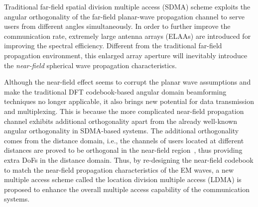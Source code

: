 \documentclass[journal,twocolumn]{IEEEtran}
\begin{document}
Traditional far-field spatial division multiple access (SDMA) scheme exploits the angular orthogonality of the far-field planar-wave propagation channel to serve users from different angles simultaneously. In order to further improve the communication rate, extremely large antenna arrays (ELAAs) are introduced for improving the spectral efficiency. Different from the traditional far-field propagation environment, this enlarged array aperture will inevitably introduce the {\it near-field} spherical wave propagation characteristics.  

Although the near-field effect seems to corrupt the planar wave assumptions and make the traditional DFT codebook-based angular domain beamforming techniques no longer applicable, it also brings new potential for data transmission and multiplexing. This is because the more complicated near-field propagation channel exhibits additional orthogonality apart from the already well-known angular orthogonality in SDMA-based systems. 
The additional orthogonality comes from the distance domain, i.e., the channels of users located at different distances are proved to be orthogonal in the near-field region~\cite{wu2022multiple}, thus providing extra DoFs in the distance domain. Thus, by re-designing the near-field codebook to match the near-field propagation characteristics of the EM waves, a new multiple access scheme called the location division multiple access (LDMA) is proposed to enhance the overall multiple access capability of the communication systems. 



\end{document}
